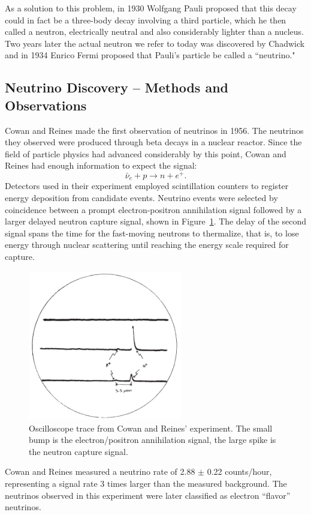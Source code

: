 As a solution to this problem, in 1930 Wolfgang Pauli proposed that this decay could in fact be a three-body decay involving a third particle, which he then called a neutron, electrically neutral and also considerably lighter than a nucleus. \cite{pauliNeuProp}  Two years later the actual neutron we refer to today was discovered by Chadwick \cite{chadwickNeutron} and in 1934 Enrico Fermi proposed that Pauli's particle be called a ``neutrino." \cite{fermiNeuName} 

\subsection{Neutrino Discovery -- Methods and Observations}
\label{discovery}

Cowan and Reines made the first observation of neutrinos in 1956.  The neutrinos they observed were produced through beta decays in a nuclear reactor.  Since the field of particle physics had advanced considerably by this point, Cowan and Reines had enough information to expect the signal: 
\begin{equation} \label{beta} \bar{\nu}_e + p \rightarrow n + e^+.  \end{equation}
Detectors used in their experiment employed scintillation counters to register energy deposition from candidate events.  Neutrino events were selected by coincidence between a prompt electron-positron annihilation signal followed by a larger delayed neutron capture signal, shown in Figure~\ref{oscilloscope}.  The delay of the second signal spans the time for the fast-moving neutrons to thermalize, that is, to lose energy through nuclear scattering until reaching the energy scale required for capture. 
\begin{figure}[b!]
  \begin{center}
    \includegraphics[width=0.6\textwidth]{figures/cowanOscilloscope.png}
  \end{center}
  \caption{Oscilloscope trace from Cowan and Reines' experiment.  The small bump is the electron/positron annihilation signal, the large spike is the neutron capture signal.}
  \label{oscilloscope}
\end{figure}
Cowan and Reines measured a neutrino rate of 2.88 $\pm$ 0.22 counts/hour, representing a signal rate 3 times larger than the measured background.  \cite{cowan}  The neutrinos observed in this experiment were later classified as electron ``flavor''  neutrinos.

